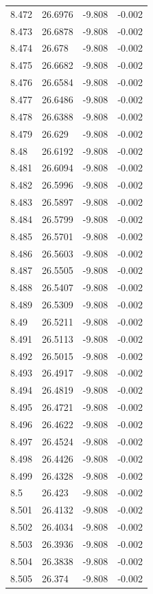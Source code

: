 \begin{tabular}{llll}
8.472 & 26.6976 & -9.808 & -0.002 \\
8.473 & 26.6878 & -9.808 & -0.002 \\
8.474 & 26.678 & -9.808 & -0.002 \\
8.475 & 26.6682 & -9.808 & -0.002 \\
8.476 & 26.6584 & -9.808 & -0.002 \\
8.477 & 26.6486 & -9.808 & -0.002 \\
8.478 & 26.6388 & -9.808 & -0.002 \\
8.479 & 26.629 & -9.808 & -0.002 \\
8.48 & 26.6192 & -9.808 & -0.002 \\
8.481 & 26.6094 & -9.808 & -0.002 \\
8.482 & 26.5996 & -9.808 & -0.002 \\
8.483 & 26.5897 & -9.808 & -0.002 \\
8.484 & 26.5799 & -9.808 & -0.002 \\
8.485 & 26.5701 & -9.808 & -0.002 \\
8.486 & 26.5603 & -9.808 & -0.002 \\
8.487 & 26.5505 & -9.808 & -0.002 \\
8.488 & 26.5407 & -9.808 & -0.002 \\
8.489 & 26.5309 & -9.808 & -0.002 \\
8.49 & 26.5211 & -9.808 & -0.002 \\
8.491 & 26.5113 & -9.808 & -0.002 \\
8.492 & 26.5015 & -9.808 & -0.002 \\
8.493 & 26.4917 & -9.808 & -0.002 \\
8.494 & 26.4819 & -9.808 & -0.002 \\
8.495 & 26.4721 & -9.808 & -0.002 \\
8.496 & 26.4622 & -9.808 & -0.002 \\
8.497 & 26.4524 & -9.808 & -0.002 \\
8.498 & 26.4426 & -9.808 & -0.002 \\
8.499 & 26.4328 & -9.808 & -0.002 \\
8.5 & 26.423 & -9.808 & -0.002 \\
8.501 & 26.4132 & -9.808 & -0.002 \\
8.502 & 26.4034 & -9.808 & -0.002 \\
8.503 & 26.3936 & -9.808 & -0.002 \\
8.504 & 26.3838 & -9.808 & -0.002 \\
8.505 & 26.374 & -9.808 & -0.002 \\

\end{tabular}
